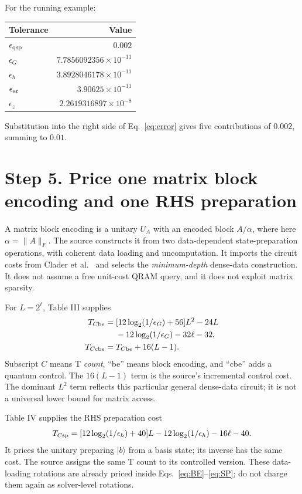 \documentclass[11pt]{article}
\newcommand{\ket}[1]{\lvert#1\rangle}
\newcommand{\norm}[1]{\lVert#1\rVert}
\begin{document}
For the running example:
\begin{center}
\begin{tabular}{lr}
\toprule
Tolerance & Value\\\midrule
$\epsilon_{\rm qsp}$ & $0.002$\\
$\epsilon_G$ & $7.7856092356\times10^{-11}$\\
$\epsilon_h$ & $3.8928046178\times10^{-11}$\\
$\epsilon_{\rm ar}$ & $3.90625\times10^{-11}$\\
$\epsilon_z$ & $2.2619316897\times10^{-8}$\\\bottomrule
\end{tabular}
\end{center}
Substitution into the right side of Eq.~\eqref{eq:error} gives five contributions of $0.002$, summing to $0.01$.

\newpage
\section*{Step 5. Price one matrix block encoding and one RHS preparation}
A matrix block encoding is a unitary $U_A$ with an encoded block $A/\alpha$, where here $\alpha=\norm A_F$. The source constructs it from two data-dependent state-preparation operations, with coherent data loading and uncomputation. It imports the circuit costs from Clader et al.~\cite{clader} and selects the \emph{minimum-depth} dense-data construction. It does not assume a free unit-cost QRAM query, and it does not exploit matrix sparsity.

For $L=2^\ell$, Table III supplies
\begin{align}\label{eq:BE}
 T_{C\rm be}={}&[12\log_2(1/\epsilon_G)+56]L^2-24L\nonumber\\
 &-12\log_2(1/\epsilon_G)-32\ell-32,\\
 T_{C\rm cbe}={}&T_{C\rm be}+16(L-1).
\end{align}
Subscript $C$ means T \emph{count}, ``be'' means block encoding, and ``cbe'' adds a quantum control. The $16(L-1)$ term is the source's incremental control cost. The dominant $L^2$ term reflects this particular general dense-data circuit; it is not a universal lower bound for matrix access.

Table IV supplies the RHS preparation cost
\begin{equation}\label{eq:SP}
 T_{C\rm sp}=[12\log_2(1/\epsilon_h)+40]L
             -12\log_2(1/\epsilon_h)-16\ell-40.
\end{equation}
It prices the unitary preparing $\ket b$ from a basis state; its inverse has the same cost. The source assigns the same T count to its controlled version. These data-loading rotations are already priced inside Eqs.~\eqref{eq:BE}--\eqref{eq:SP}; do not charge them again as solver-level rotations.
\end{document}
